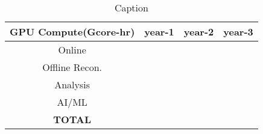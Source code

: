 \begin{table}[htb!]
    \centering
    \begin{tabular}{c|c|c|c}
        \hline
        GPU Compute(Gcore-hr) & year-1 & year-2 & year-3 \\
        \hline
        \hline
        Online   & & & \\
        \hline
        Offline Recon. & & & \\
        \hline
        Analysis  & & & \\
        \hline
        AI/ML    & & & \\
        \hline
        \textbf{TOTAL} & & & \\
        \hline
    \end{tabular}
    \caption{Caption}
    \label{tab:gpu_summary}
\end{table}


